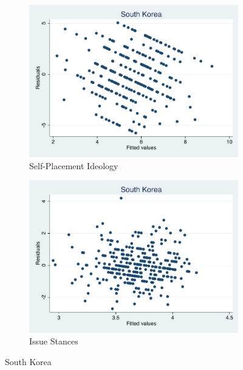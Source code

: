 \documentclass[12pt, titlepage]{article}
\begin{document}
\begin{figure}[H]
	\centering
	\begin{subfigure}[b]{0.475\textwidth}   
		\centering 
		\includegraphics[width=\textwidth]{Residuals/CountryIdeo/SKorea}
		\caption{Self-Placement Ideology}
	\end{subfigure}
	\hfill
	\begin{subfigure}[b]{0.475\textwidth}
		\centering 
		\includegraphics[width=\textwidth]{Residuals/CountryLib/SKorea}
		\caption{Issue Stances}
	\end{subfigure}
	\caption{South Korea}
	\label{SKorea}
\end{figure}
\end{document}
